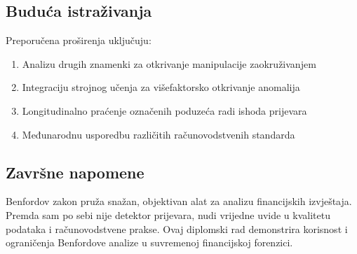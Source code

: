 \documentclass[12pt,a4paper]{article}
\begin{document}
\subsection{Buduća istraživanja}

Preporučena proširenja uključuju:
\begin{enumerate}
    \item Analizu drugih znamenki za otkrivanje manipulacije zaokruživanjem
    \item Integraciju strojnog učenja za višefaktorsko otkrivanje anomalija
    \item Longitudinalno praćenje označenih poduzeća radi ishoda prijevara
    \item Međunarodnu usporedbu različitih računovodstvenih standarda
\end{enumerate}

\subsection{Završne napomene}

Benfordov zakon pruža snažan, objektivan alat za analizu financijskih izvještaja. Premda sam po sebi nije detektor prijevara, nudi vrijedne uvide u kvalitetu podataka i računovodstvene prakse. Ovaj diplomski rad demonstrira korisnost i ograničenja Benfordove analize u suvremenoj financijskoj forenzici.

\newpage


\end{document}
